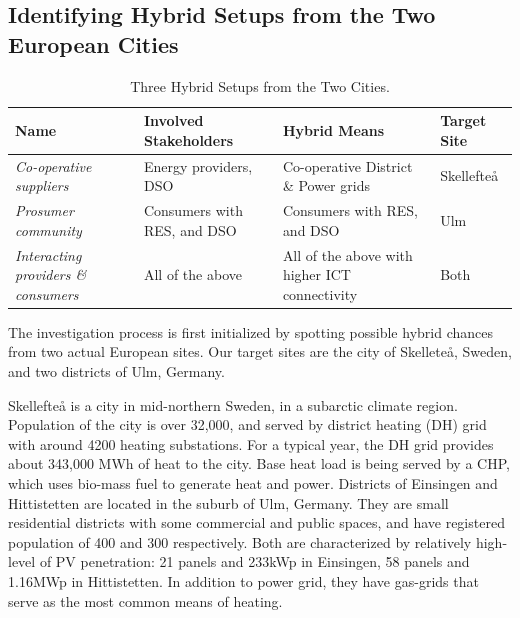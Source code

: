 \documentclass[review]{elsarticle}
\begin{document}
\subsection{Identifying Hybrid Setups from the Two European Cities}
\label{sec:req-1}

\begin{table}[t]
  \centering
  \caption{Three Hybrid Setups from the Two Cities.}
  \label{tab:1}
  \begin{tabular}{|p{3cm}|p{4cm}|p{4cm}|p{2cm}|}
    \hline
    Name & Involved Stakeholders & Hybrid Means & Target Site \\ \hline
    {\em Co-operative suppliers} & Energy providers, DSO & Co-operative District \& Power grids & Skellefte\aa \\ \hline 
    {\em Prosumer community} & Consumers with RES, and DSO & Consumers with RES, and DSO & Ulm \\ \hline 
    {\em Interacting providers \& consumers} & All of the above & All of the above with higher ICT connectivity & Both\\ \hline  
  \end{tabular}
\end{table}


The investigation process is first initialized by spotting possible
hybrid chances from two actual European sites. 
Our target sites are the city of Skellete\aa , Sweden, and two
districts of Ulm, Germany.  

Skellefte{\aa}  is a city in mid-northern Sweden, in a subarctic
climate region. Population of the city is over 32,000, and served by
district heating (DH) grid with around 4200 heating substations. For a 
typical year, the DH grid provides about 343,000 MWh of heat to the 
city. Base heat load is being served by a CHP, which uses bio-mass
fuel to generate heat and power. 
Districts of Einsingen and Hittistetten are located in the suburb of
Ulm, Germany. They are small residential districts with some
commercial and  public spaces, and have registered population of 400
and 300 respectively. Both are characterized by relatively high-level
of PV penetration: 21 panels and 233kWp in Einsingen, 58 panels and 
1.16MWp in Hittistetten. In addition to power grid, they have
gas-grids that serve as the most common means of heating.  
\end{document}

